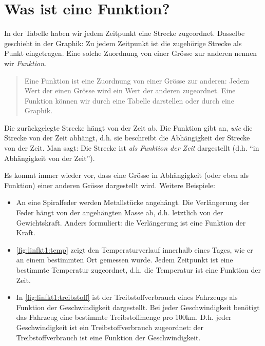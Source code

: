 \documentclass[%
11pt,%
twoside,%
titlepage,%
german,%
headsepline%
]{scrartcl}
\newcommand{\rede}[1]{``#1''}
\begin{document}
\section{Was ist eine Funktion?}
\label{linfkt1:was}

In der Tabelle haben wir jedem Zeitpunkt eine Strecke zugeordnet. Dasselbe geschieht in der Graphik: Zu jedem Zeitpunkt ist die zugeh\"orige Strecke als Punkt eingetragen. Eine solche Zuordnung von einer Gr\"osse zur anderen nennen wir \emph{Funktion}.

\begin{quotation}
  Eine Funktion ist eine Zuordnung von einer Gr\"osse zur anderen: Jedem Wert der einen Gr\"osse wird ein Wert der anderen zugeordnet. Eine Funktion k\"onnen wir durch eine Tabelle darstellen oder durch eine Graphik.  
\end{quotation}

Die zur\"uckgelegte Strecke h\"angt von der Zeit ab. Die Funktion gibt an, \emph{wie} die Strecke von der Zeit abh\"angt, d.h. sie beschreibt die Abh\"angigkeit der Strecke von der Zeit. Man sagt: Die Strecke ist \emph{als Funktion der Zeit} dargestellt (d.h. \rede{in Abh\"angigkeit von der Zeit}).

Es kommt immer wieder vor, dass eine Gr\"osse in Abh\"angigkeit (oder eben als Funktion) einer anderen Gr\"osse dargestellt wird. Weitere Beispiele:
\begin{itemize}
\item An eine Spiralfeder werden Metallst\"ucke angeh\"angt. Die Verl\"angerung der Feder h\"angt von der angeh\"angten Masse ab, d.h. letztlich von der Gewichtskraft. Anders formuliert: die Verl\"angerung ist eine Funktion der Kraft.
\item \ref{fig:linfkt1:temp} zeigt den Temperaturverlauf innerhalb eines Tages, wie er an einem bestimmten Ort gemessen wurde. Jedem Zeitpunkt ist eine bestimmte Temperatur zugeordnet, d.h. die Temperatur ist eine Funktion der Zeit.
\item In \ref{fig:linfkt1:treibstoff} ist der Treibstoffverbrauch eines Fahrzeugs als Funktion der Geschwindigkeit dargestellt. Bei jeder Geschwindigkeit ben\"otigt das Fahrzeug eine bestimmte Treibstoffmenge pro 100\unit{km}. D.h. jeder Geschwindigkeit ist ein Treibstoffverbrauch zugeordnet: der Treibstoffverbrauch ist eine Funktion der Geschwindigkeit.
\end{itemize}
\end{document}
